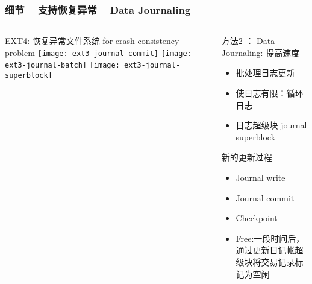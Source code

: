 \begin{frame}[fragile]
	\frametitle{细节 -- 支持恢复异常 -- Data Journaling}
	\begin{columns}
		\begin{column}{.5\textwidth}
			EXT4: 恢复异常文件系统 for crash-consistency problem
			\texttt{[image: ext3-journal-commit]}
			\texttt{[image: ext3-journal-batch]}
			\texttt{[image: ext3-journal-superblock]}
		\end{column}
		\begin{column}{.5\textwidth}			
			方法2 ： Data Journaling: 提高速度
			\begin{itemize}
				\item  批处理日志更新
				\item  使日志有限：循环日志
				\item 日志超级块 journal	superblock
			\end{itemize}
			\pause
			新的更新过程
			\begin{itemize}	
				\item Journal write
				\item Journal commit
				\item Checkpoint
				\item Free:一段时间后，通过更新日记帐超级块将交易记录标记为空闲
				
			\end{itemize}

		\end{column}
	\end{columns}
	
\end{frame}


